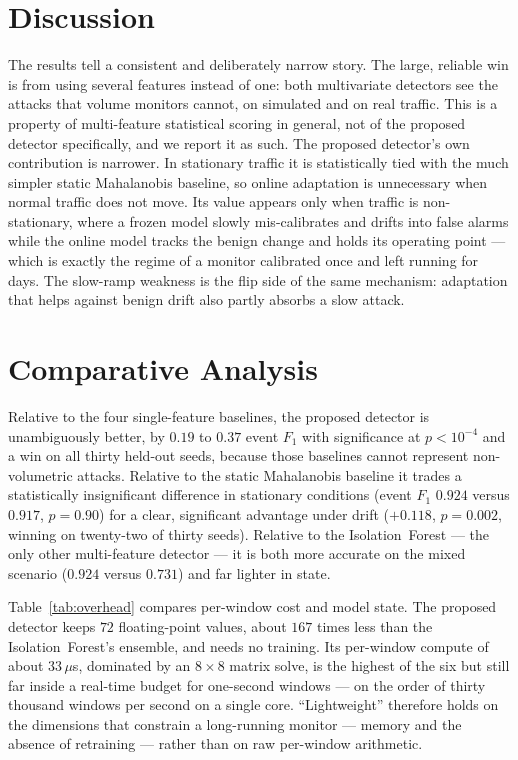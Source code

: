 \documentclass[11pt,a4paper]{article}
\begin{document}
\section{Discussion}
The results tell a consistent and deliberately narrow story. The large, reliable
win is from using several features instead of one: both multivariate detectors
see the attacks that volume monitors cannot, on simulated and on real traffic.
This is a property of multi-feature statistical scoring in general, not of the
proposed detector specifically, and we report it as such. The proposed detector's
own contribution is narrower. In stationary traffic it is statistically tied with
the much simpler static Mahalanobis baseline, so online adaptation is unnecessary
when normal traffic does not move. Its value appears only when traffic is
non-stationary, where a frozen model slowly mis-calibrates and drifts into false
alarms while the online model tracks the benign change and holds its operating
point --- which is exactly the regime of a monitor calibrated once and left
running for days. The slow-ramp weakness is the flip side of the same mechanism:
adaptation that helps against benign drift also partly absorbs a slow attack.

\section{Comparative Analysis}
Relative to the four single-feature baselines, the proposed detector is
unambiguously better, by $0.19$ to $0.37$ event $F_1$ with significance at
$p < 10^{-4}$ and a win on all thirty held-out seeds, because those baselines
cannot represent non-volumetric attacks. Relative to the static Mahalanobis
baseline it trades a statistically insignificant difference in stationary
conditions (event $F_1$ $0.924$ versus $0.917$, $p = 0.90$) for a clear,
significant advantage under drift ($+0.118$, $p = 0.002$, winning on
twenty-two of thirty seeds). Relative to the Isolation~Forest --- the only other
multi-feature detector --- it is both more accurate on the mixed scenario
($0.924$ versus $0.731$) and far lighter in state.

Table~\ref{tab:overhead} compares per-window cost and model state. The proposed
detector keeps $72$ floating-point values, about $167$ times less than the
Isolation~Forest's ensemble, and needs no training. Its per-window compute of
about $33\,\mu$s, dominated by an $8\times8$ matrix solve, is the highest of the
six but still far inside a real-time budget for one-second windows --- on the
order of thirty thousand windows per second on a single core. ``Lightweight''
therefore holds on the dimensions that constrain a long-running monitor --- memory
and the absence of retraining --- rather than on raw per-window arithmetic.
\end{document}
